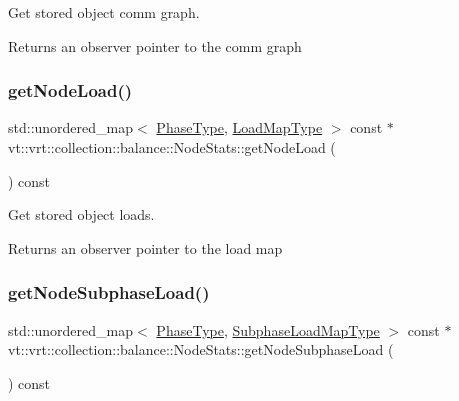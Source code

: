 Get stored object comm graph. 

\begin{DoxyReturn}{Returns}
an observer pointer to the comm graph 
\end{DoxyReturn}
\mbox{\label{structvt_1_1vrt_1_1collection_1_1balance_1_1_node_stats_a5b34d26f9e10f7ff3ceb92b95f0ed2f6}} 
\subsubsection{\texorpdfstring{get\+Node\+Load()}{getNodeLoad()}}
{\footnotesize\ttfamily std\+::unordered\+\_\+map$<$ \hyperlink{namespacevt_a46ce6733d5cdbd735d561b7b4029f6d7}{Phase\+Type}, \hyperlink{namespacevt_1_1vrt_1_1collection_1_1balance_a45306ee4bf38fe3fb586d1ee2fa3d147}{Load\+Map\+Type} $>$ const  $\ast$ vt\+::vrt\+::collection\+::balance\+::\+Node\+Stats\+::get\+Node\+Load (\begin{DoxyParamCaption}{ }\end{DoxyParamCaption}) const}



Get stored object loads. 

\begin{DoxyReturn}{Returns}
an observer pointer to the load map 
\end{DoxyReturn}
\mbox{\label{structvt_1_1vrt_1_1collection_1_1balance_1_1_node_stats_a24660f52ff5e6a734a443ebbd1852519}} 
\subsubsection{\texorpdfstring{get\+Node\+Subphase\+Load()}{getNodeSubphaseLoad()}}
{\footnotesize\ttfamily std\+::unordered\+\_\+map$<$ \hyperlink{namespacevt_a46ce6733d5cdbd735d561b7b4029f6d7}{Phase\+Type}, \hyperlink{namespacevt_1_1vrt_1_1collection_1_1balance_a3d91523158c1025b7b665240072f3b7e}{Subphase\+Load\+Map\+Type} $>$ const  $\ast$ vt\+::vrt\+::collection\+::balance\+::\+Node\+Stats\+::get\+Node\+Subphase\+Load (\begin{DoxyParamCaption}{ }\end{DoxyParamCaption}) const}



